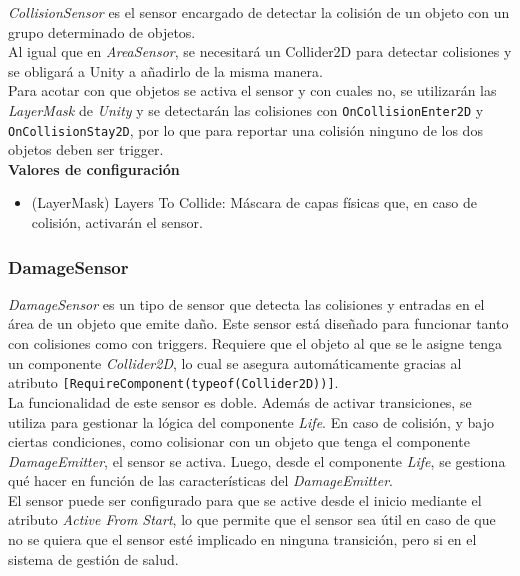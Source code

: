 \textit{CollisionSensor} es el sensor encargado de detectar la colisión de un objeto con un grupo determinado de objetos.\\

Al igual que en \textit{AreaSensor}, se necesitará un Collider2D para detectar colisiones y se obligará a Unity a añadirlo de la misma manera.\\

Para acotar con que objetos se activa el sensor y con cuales no, se utilizarán las \textit{LayerMask} de \textit{Unity} y se detectarán las colisiones con \texttt{OnCollisionEnter2D} y \texttt{OnCollisionStay2D}, por lo que para reportar una colisión ninguno de los dos objetos deben ser trigger.\\

\textbf{Valores de configuración}
\begin{itemize}
	\item (LayerMask) Layers To Collide: Máscara de capas físicas que, en caso de colisión, activarán el sensor.
\end{itemize}

\subsubsection{DamageSensor}

\textit{DamageSensor} es un tipo de sensor que detecta las colisiones y entradas en el área de un objeto que emite daño. Este sensor está diseñado para funcionar tanto con colisiones como con triggers. Requiere que el objeto al que se le asigne tenga un componente \textit{Collider2D}, lo cual se asegura automáticamente gracias al atributo \texttt{[RequireComponent(typeof(Collider2D))]}.\\

La funcionalidad de este sensor es doble. Además de activar transiciones, se utiliza para gestionar la lógica del componente \textit{Life}. En caso de colisión, y bajo ciertas condiciones, como colisionar con un objeto que tenga el componente \textit{DamageEmitter}, el sensor se activa. Luego, desde el componente \textit{Life}, se gestiona qué hacer en función de las características del \textit{DamageEmitter}.\\

El sensor puede ser configurado para que se active desde el inicio mediante el atributo \textit{Active From Start}, lo que permite que el sensor sea útil en caso de que no se quiera que el sensor esté implicado en ninguna transición, pero si en el sistema de gestión de salud.\\

